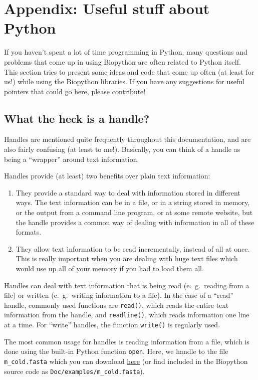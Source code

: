 \chapter{Appendix: Useful stuff about Python}
\label{chapter:appendix}

If you haven't spent a lot of time programming in Python, many
questions and problems that come up in using Biopython are often
related to Python itself. This section tries to present some ideas and
code that come up often (at least for us!) while using the Biopython
libraries. If you have any suggestions for useful pointers that could
go here, please contribute!

\section{What the heck is a handle?}
\label{sec:appendix-handles}

Handles are mentioned quite frequently throughout this documentation,
and are also fairly confusing (at least to me!). Basically, you can
think of a handle as being a ``wrapper'' around text information.

Handles provide (at least) two benefits over plain text information:

\begin{enumerate}
  \item They provide a standard way to deal with information stored in
  different ways. The text information can be in a file, or in a
  string stored in memory, or the output from a command line program,
  or at some remote website, but the handle provides a common way of
  dealing with information in all of these formats.

  \item They allow text information to be read incrementally, instead
  of all at once. This is really important when you are dealing with
  huge text files which would use up all of your memory if you had to
  load them all.
\end{enumerate}

Handles can deal with text information that is being read (e.~g.~reading
from a file) or written (e.~g.~writing information to a file). In the
case of a ``read'' handle, commonly used functions are \verb|read()|,
which reads the entire text information from the handle, and
\verb|readline()|, which reads information one line at a time. For
``write'' handles, the function \verb|write()| is regularly used.

The most common usage for handles is reading information from a file,
which is done using the built-in Python function \verb|open|. Here,
we handle to the file \texttt{m\_cold.fasta} which you can download
\href{https://raw.githubusercontent.com/biopython/biopython/master/Doc/examples/m\_cold.fasta}{here}
(or find included in the Biopython source code as \texttt{Doc/examples/m\_cold.fasta}).

